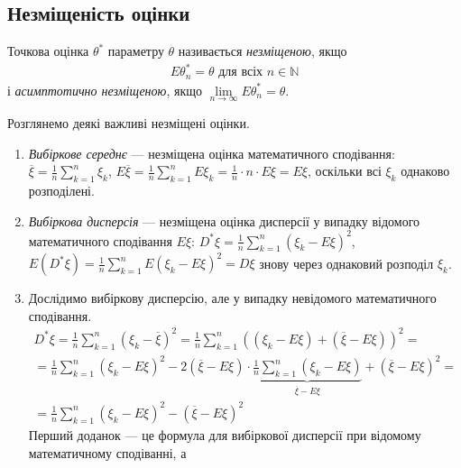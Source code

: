 \subsection{Незміщеність оцінки}
 \begin{definition}
    Точкова оцінка $\theta^*$ параметру $\theta$ називається \emph{незміщеною}, якщо
    \begin{gather}\label{estim_unbiased}
        E\theta^*_n = \theta \text{ для всіх } n\in\mathbb{N}
    \end{gather} 
    і \emph{асимптотично незміщеною}, якщо $\underset{n\to\infty}{\lim} E\theta^*_n = \theta$. 
 \end{definition}
 \begin{example} 
    Розглянемо деякі важливі незміщені оцінки.
    \begin{enumerate}
        \item \emph{Вибіркове середнє} --- незміщена оцінка математичного сподівання:
        $\overline{\xi} = \frac{1}{n}\sum\limits_{k=1}^n \xi_k$, $E\overline{\xi} = \frac{1}{n}\sum\limits_{k=1}^n E\xi_k = \frac{1}{n} \cdot{n} \cdot{E\xi} = E\xi$,
        оскільки всі $\xi_k$ однаково розподілені.
        \item \emph{Вибіркова дисперсія} --- незміщена оцінка дисперсії у випадку відомого математичного сподівання $E\xi$:
        $D^*\xi = \frac{1}{n}\sum\limits_{k=1}^n \left(\xi_k - E\xi \right)^2$, 
        $E\left( D^* \xi\right) = \frac{1}{n}\sum\limits_{k=1}^n E\left(\xi_k - E\xi \right)^2 = D\xi$ знову через однаковий розподіл $\xi_k$.
        \item Дослідимо вибіркову дисперсію, але у випадку невідомого математичного сподівання. 
        \begin{gather*}
            D^*\xi = \frac{1}{n}\sum\limits_{k=1}^n \left(\xi_k - \overline{\xi} \right)^2 = 
            \frac{1}{n}\sum\limits_{k=1}^n \left((\xi_k - E\xi) + (\overline{\xi} - E\xi) \right)^2 =  \\
            = \frac{1}{n}\sum\limits_{k=1}^n \left(\xi_k - E\xi \right)^2 - 2\left(\overline{\xi} - E\xi\right)\cdot 
            \underbrace{\frac{1}{n}\sum\limits_{k=1}^n \left(\xi_k - E\xi\right)}_{\overline{\xi} - E\xi} + \left(\overline{\xi} - E\xi\right)^2 = \\
            = \frac{1}{n}\sum\limits_{k=1}^n \left(\xi_k - E\xi \right)^2 - \left(\overline{\xi} - E\xi\right)^2
        \end{gather*}
        Перший доданок --- це формула для вибіркової дисперсії при відомому математичному сподіванні, а 

\end{enumerate}
\end{example}
